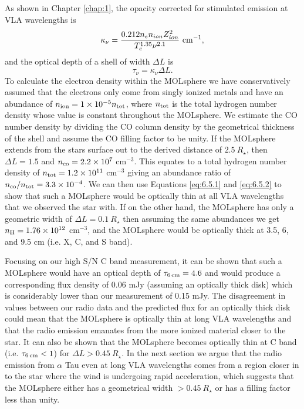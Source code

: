 As shown in Chapter \ref{chap:1}, the opacity corrected for stimulated emission at VLA wavelengths is
\begin{equation}
\kappa _{\nu} =\frac{0.212n_{e}n_{ion}Z_{ion}^2}{T_{e}^{1.35}\nu ^{2.1}} \ \rm{cm}^{-1},
\label{eq:6.5.1}
\end{equation}
and the optical depth of a shell of width $\Delta L$ is
\begin{equation}
\tau _{\nu} =\kappa _{\nu}\Delta L.
\label{eq:6.5.2}
\end{equation}
To calculate the electron density within the MOLsphere we have conservatively assumed that the electrons only come from singly ionized metals and have an abundance of $n_{\rm{ion}}=1\times 10^{-5} n_{\rm{tot}}$, where $n_{\rm{tot}}$ is the total hydrogen number density whose value is constant throughout the MOLsphere. We estimate the CO number density by dividing the CO column density by the geometrical thickness of the shell and assume the CO filling factor to be unity. If the MOLsphere extends from the stars surface out to the derived distance of $2.5 \ R_{\star}$, then $\Delta L = 1.5$ and $n_{\rm{co}} = 2.2 \times 10^{7} $ cm$^{-3}$. This equates to a total hydrogen number density of $n_{\rm{tot}}=1.2 \times 10^{11}$ cm$^{-3}$ \citep{ohnaka_2013} giving an abundance ratio of $n_{\rm{co}}/n_{\rm{tot}} = 3.3\times 10^{-4}$. We can then use Equations \ref{eq:6.5.1} and \ref{eq:6.5.2} to show that such a MOLsphere would be optically thin at all VLA wavelengths that we observed the star with. If on the other hand, the MOLsphere has only a geometric width of $\Delta L = 0.1 \ R_{\star}$ then assuming the same abundances we get $n_{\rm{H}}=1.76\times 10^{12}$ cm$^{-3}$, and the MOLsphere would be optically thick at 3.5, 6, and 9.5 cm (i.e. X, C, and S band). 

Focusing on our high S/N C band measurement, it can be shown that such a MOLsphere would have an optical depth of $\tau _{\rm{6\,cm}} = 4.6$ and would produce a corresponding flux density of  0.06 mJy (assuming an optically thick disk) which is considerably lower than our measurement of 0.15 mJy. The disagreement in values between our radio data and the predicted flux for an optically thick disk could mean that the MOLsphere is optically thin at long VLA wavelengths and that the radio emission emanates from the more ionized material closer to the star. It can also be shown that the MOLsphere becomes optically thin at C band (i.e. $\tau _{\rm{6\,cm}} < 1$) for $\Delta L > 0.45 \ R_{\star}$. In the next section we argue that the radio emission from $\alpha$ Tau even at long VLA wavelengths comes from a region closer in to the star where the wind is undergoing rapid acceleration, which suggests that the MOLsphere either has a geometrical width  $> 0.45 \ R _{\star}$ or has a filling factor less than unity.

